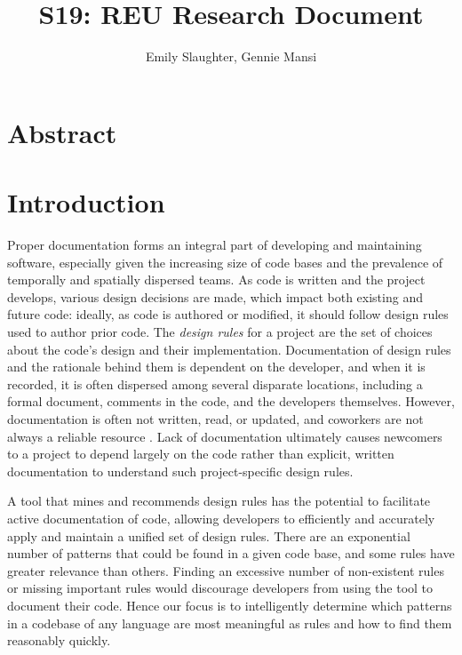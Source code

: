 \documentclass[12pt]{article}
\title{S19: REU Research Document}
\author{Emily Slaughter, Gennie Mansi}
\begin{document}
\maketitle

\clearpage

\tableofcontents

\clearpage

\section{Abstract} \label{abstract}



\clearpage
\section{Introduction} \label{intro}

Proper documentation forms an integral part of developing and maintaining software, especially given the increasing size of code bases and the prevalence of temporally and spatially dispersed teams. As code is written and the project develops, various design decisions are made, which impact both existing and future code: ideally, as code is authored or modified, it should follow design rules used to author prior code. The \textit{design rules} for a project are the set of choices about the code's design and their implementation. Documentation of design rules and the rationale behind them is dependent on the developer, and when it is recorded, it is often dispersed among several disparate locations, including a formal document, comments in the code, and the developers themselves. However, documentation is often not written, read, or updated, and coworkers are not always a reliable resource \cite{KoEtAl2007}. Lack of documentation ultimately causes newcomers to a project to depend largely on the code rather than explicit, written documentation to understand such project-specific design rules.

A tool that mines and recommends design rules has the potential to facilitate active documentation of code, allowing developers to efficiently and accurately apply and maintain a unified set of design rules. There are an exponential number of patterns that could be found in a given code base, and some rules have greater relevance than others. Finding an excessive number of non-existent rules or missing important rules would discourage developers from using the tool to document their code. Hence our focus is to intelligently determine which patterns in a codebase of any language are most meaningful as rules and how to find them reasonably quickly.
\end{document}
